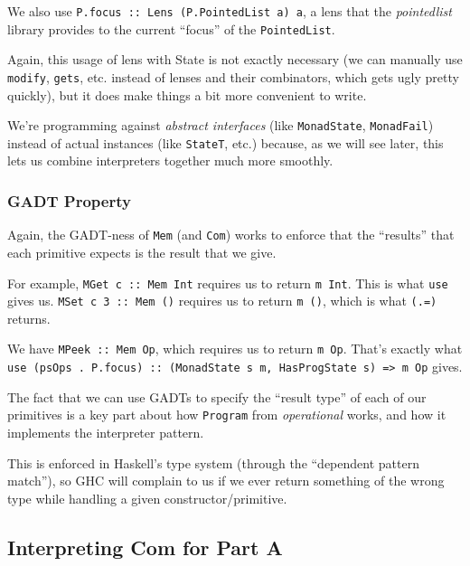 \documentclass[]{article}
\begin{document}
We also use \texttt{P.focus\ ::\ Lens\textquotesingle{}\ (P.PointedList\ a)\ a},
a lens that the \emph{pointedlist} library provides to the current ``focus'' of
the \texttt{PointedList}.

Again, this usage of lens with State is not exactly necessary (we can manually
use \texttt{modify}, \texttt{gets}, etc. instead of lenses and their
combinators, which gets ugly pretty quickly), but it does make things a bit more
convenient to write.

We're programming against \emph{abstract interfaces} (like \texttt{MonadState},
\texttt{MonadFail}) instead of actual instances (like \texttt{StateT}, etc.)
because, as we will see later, this lets us combine interpreters together much
more smoothly.

\hypertarget{gadt-property}{%
\subsubsection{GADT Property}\label{gadt-property}}

Again, the GADT-ness of \texttt{Mem} (and \texttt{Com}) works to enforce that
the ``results'' that each primitive expects is the result that we give.

For example, \texttt{MGet\ \textquotesingle{}c\textquotesingle{}\ ::\ Mem\ Int}
requires us to return \texttt{m\ Int}. This is what \texttt{use} gives us.
\texttt{MSet\ \textquotesingle{}c\textquotesingle{}\ 3\ ::\ Mem\ ()} requires us
to return \texttt{m\ ()}, which is what \texttt{(.=)} returns.

We have \texttt{MPeek\ ::\ Mem\ Op}, which requires us to return \texttt{m\ Op}.
That's exactly what
\texttt{use\ (psOps\ .\ P.focus)\ ::\ (MonadState\ s\ m,\ HasProgState\ s)\ =\textgreater{}\ m\ Op}
gives.

The fact that we can use GADTs to specify the ``result type'' of each of our
primitives is a key part about how \texttt{Program} from \emph{operational}
works, and how it implements the interpreter pattern.

This is enforced in Haskell's type system (through the ``dependent pattern
match''), so GHC will complain to us if we ever return something of the wrong
type while handling a given constructor/primitive.

\hypertarget{interpreting-com-for-part-a}{%
\subsection{Interpreting Com for Part A}\label{interpreting-com-for-part-a}}
\end{document}
